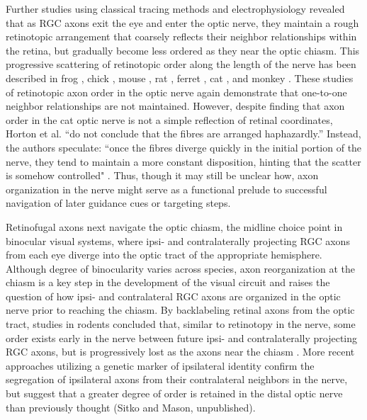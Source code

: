 Further studies using classical tracing methods and electrophysiology revealed that as RGC axons exit the eye and enter the optic nerve, they maintain a rough retinotopic arrangement that coarsely reflects their neighbor relationships within the retina, but gradually become less ordered as they near the optic chiasm.
This progressive scattering of retinotopic order along the length of the nerve has been described in frog \cite{montgomery1998organization}, chick \cite{ehrlich1984course}, mouse \cite{chan1999changes,plas2005pretarget}, rat \cite{chan1994changes,simon1991relationship}, ferret \cite{reese1993reestablishment}, cat \cite{horton1979non,naito1986course}, and monkey \cite{naito1994retinogeniculate}.
These studies of retinotopic axon order in the optic nerve again demonstrate that one-to-one neighbor relationships are not maintained.
However, despite finding that axon order in the cat optic nerve is not a simple reflection of retinal coordinates, Horton et al. “do not conclude that the fibres are arranged haphazardly.”
Instead, the authors speculate: “once the fibres diverge quickly in the initial portion of the nerve, they tend to maintain a more constant disposition, hinting that the scatter is somehow controlled" \cite{horton1979non}.
Thus, though it may still be unclear how, axon organization in the nerve might serve as a functional prelude to successful navigation of later guidance cues or targeting steps.

Retinofugal axons next navigate the optic chiasm, the midline choice point in binocular visual systems, where ipsi- and contralaterally projecting RGC axons from each eye diverge into the optic tract of the appropriate hemisphere.
Although degree of binocularity varies across species, axon reorganization at the chiasm is a key step in the development of the visual circuit and raises the question of how ipsi- and contralateral RGC axons are organized in the optic nerve prior to reaching the chiasm.
By backlabeling retinal axons from the optic tract, studies in rodents concluded that, similar to retinotopy in the nerve, some order exists early in the nerve between future ipsi- and contralaterally projecting RGC axons, but is progressively lost as the axons near the chiasm \cite{baker1989distribution,colello1990early}.
More recent approaches utilizing a genetic marker of ipsilateral identity confirm the segregation of ipsilateral axons from their contralateral neighbors in the nerve, but suggest that a greater degree of order is retained in the distal optic nerve than previously thought (Sitko and Mason, unpublished).


